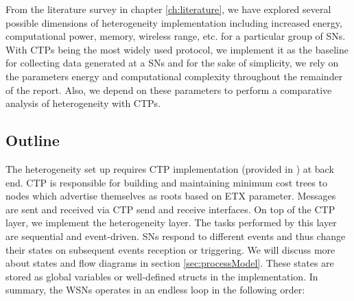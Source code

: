     From the literature survey in chapter \ref{ch:literature}, we have explored several possible dimensions of  heterogeneity implementation including increased energy, computational power, memory, wireless range, etc. for a particular group of \acp{SN}. With \acp{CTP} being the most widely used protocol, we implement it as the baseline for collecting data generated at a \acp{SN} and for the sake of simplicity, we rely on the parameters energy and computational complexity throughout the remainder of the report. Also, we depend on these parameters to perform a comparative analysis of heterogeneity with \acp{CTP}.
    
    \subsection{Outline}
    
    The heterogeneity set up requires \ac{CTP} implementation (provided in \cite{tinyOS:ctpImplementation}) at back end. \ac{CTP} is responsible for building and maintaining minimum cost trees to nodes which advertise themselves as roots based on \ac{ETX} parameter. Messages are sent and received via \ac{CTP} send and receive interfaces. On top of the \ac{CTP} layer, we implement the heterogeneity layer. The tasks performed by this layer are sequential and event-driven. \acp{SN} respond to different events and thus change their states on subsequent events reception or triggering. We will discuss more about states and flow diagrams in section \ref{sec:processModel}. These states are stored as global variables  or well-defined structs in the implementation. In summary, the \acp{WSN} operates in an endless loop in the following order:
    
